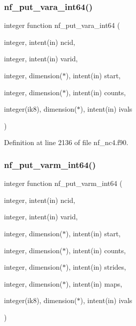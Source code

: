 \mbox{\label{nf__nc4_8f90_aaa2e15a12ff25e718fa2c8a01cc86ae9}} 
\subsubsection{\texorpdfstring{nf\+\_\+put\+\_\+vara\+\_\+int64()}{nf\_put\_vara\_int64()}}
{\footnotesize\ttfamily integer function nf\+\_\+put\+\_\+vara\+\_\+int64 (\begin{DoxyParamCaption}\item[{integer, intent(in)}]{ncid,  }\item[{integer, intent(in)}]{varid,  }\item[{integer, dimension($\ast$), intent(in)}]{start,  }\item[{integer, dimension($\ast$), intent(in)}]{counts,  }\item[{integer(ik8), dimension($\ast$), intent(in)}]{ivals }\end{DoxyParamCaption})}



Definition at line 2136 of file nf\+\_\+nc4.\+f90.

\mbox{\label{nf__nc4_8f90_a2a0451379c49b344c4cd83c97095d2b2}} 
\subsubsection{\texorpdfstring{nf\+\_\+put\+\_\+varm\+\_\+int64()}{nf\_put\_varm\_int64()}}
{\footnotesize\ttfamily integer function nf\+\_\+put\+\_\+varm\+\_\+int64 (\begin{DoxyParamCaption}\item[{integer, intent(in)}]{ncid,  }\item[{integer, intent(in)}]{varid,  }\item[{integer, dimension($\ast$), intent(in)}]{start,  }\item[{integer, dimension($\ast$), intent(in)}]{counts,  }\item[{integer, dimension($\ast$), intent(in)}]{strides,  }\item[{integer, dimension($\ast$), intent(in)}]{maps,  }\item[{integer(ik8), dimension($\ast$), intent(in)}]{ivals }\end{DoxyParamCaption})}



